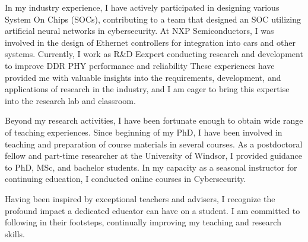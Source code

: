 \documentclass[12pt,oneside]{book}
\begin{document}
In my industry experience, I have actively participated in designing various System On Chips (SOCs), contributing to a team that designed an SOC utilizing artificial neural networks in cybersecurity. At NXP Semiconductors, I was involved in the design of Ethernet controllers for integration into cars and other systems. Currently, I work as R\&D Eexpert conducting research and development to improve DDR PHY performance and reliability  These experiences have provided me with valuable insights into the requirements, development, and applications of research in the industry, and I am eager to bring this expertise into the research lab and classroom.

%
 
Beyond my research activities, I have been fortunate enough to obtain wide range of teaching experiences. Since beginning  of my PhD, I have been involved in teaching and preparation of course materials in several courses.  
As a postdoctoral fellow and part-time researcher at the University of Windsor, I provided guidance to PhD, MSc, and bachelor students. In my capacity as a seasonal instructor for continuing education, I conducted online courses in Cybersecurity.

Having been inspired by exceptional teachers and advisers, I recognize the profound impact a dedicated educator can have on a student. I am committed to following in their footsteps, continually improving my teaching and research skills.
\end{document}
